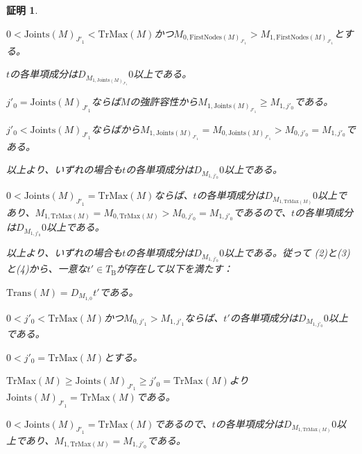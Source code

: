 \documentclass[dvipdfmx,uplatex]{jsarticle}
\theoremstyle{customnonumberbreakfortheorem}
\theoremstyle{customnonumberbreakforproof}
\newtheorem{hideableproof}{証明}
\begin{document}
\begin{hideableproof}
\begin{indented}
\begin{indented}
\begin{penumerate}
				\item \(0 < \textrm{Joints}(M)_{J'_1} < \textrm{TrMax}(M)\)かつ\(M_{0,\textrm{FirstNodes}(M)_{J'_1}} > M_{1,\textrm{FirstNodes}(M)_{J'_1}}\)とする。
				\begin{indented}
					\item \(t\)の各単項成分は\(D_{M_{1,\textrm{Joints}(M)_{J'_1}}} 0\)以上である。
					\item \(j'_0 = \textrm{Joints}(M)_{J'_1}\)ならば\(M\)の強許容性から\(M_{1,\textrm{Joints}(M)_{J'_1}} \geq M_{1,j'_0}\)である。
					\item \(j'_0 < \textrm{Joints}(M)_{J'_1}\)ならばから\(M_{1,\textrm{Joints}(M)_{J'_1}} = M_{0,\textrm{Joints}(M)_{J'_1}} > M_{0,j'_0} = M_{1,j'_0}\)である。
					\item 以上より、いずれの場合も\(t\)の各単項成分は\(D_{M_{1,j'_0}} 0\)以上である。
				\end{indented}
				\item \(0 < \textrm{Joints}(M)_{J'_1} = \textrm{TrMax}(M)\)ならば、\(t\)の各単項成分は\(D_{M_{1,\textrm{TrMax}(M)}} 0\)以上であり、\(M_{1,\textrm{TrMax}(M)} = M_{0,\textrm{TrMax}(M)} > M_{0,j'_0} = M_{1,j'_0}\)であるので、\(t\)の各単項成分は\(D_{M_{1,j'_0}} 0\)以上である。
				\item[] 以上より、いずれの場合も\(t\)の各単項成分は\(D_{M_{1,j'_0}} 0\)以上である。従って (2)と(3)と(4)から、一意な\(t' \in T_{\textrm{B}}\)が存在して以下を満たす：
				\begin{penumerate}
					\item \(\textrm{Trans}(M) = D_{M_{1,0}} t'\)である。
					\setcounter{penumerateii}{2}
					\item \(0 < j'_0 < \textrm{TrMax}(M)\)かつ\(M_{0,j'_1} > M_{1,j'_1}\)ならば、\(t'\)の各単項成分は\(D_{M_{1,j'_0}} 0\)以上である。
				\end{penumerate}
			\end{penumerate}
			\item \(0 < j'_0 = \textrm{TrMax}(M)\)とする。
			\begin{penumerate}
				\item[] \(\textrm{TrMax}(M) \geq \textrm{Joints}(M)_{J'_1} \geq j'_0 = \textrm{TrMax}(M)\)より\(\textrm{Joints}(M)_{J'_1} = \textrm{TrMax}(M)\)である。
				\setcounter{penumeratei}{3}
				\item \(0 < \textrm{Joints}(M)_{J'_1} = \textrm{TrMax}(M)\)であるので、\(t\)の各単項成分は\(D_{M_{1,\textrm{TrMax}(M)}} 0\)以上であり、\(M_{1,\textrm{TrMax}(M)} = M_{1,j'_0}\)である。

\end{penumerate}
\end{indented}
\end{indented}
\end{hideableproof}
\end{document}
